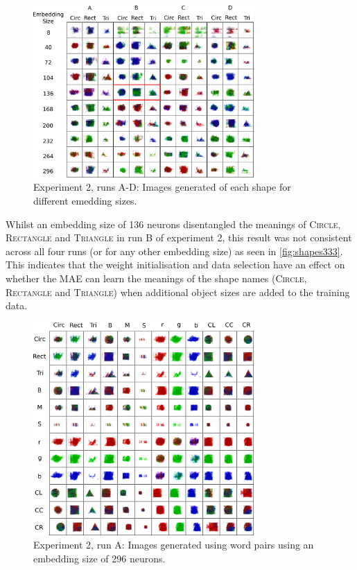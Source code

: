\begin{figure}[h]
\centering
\includegraphics[width=0.75\textwidth]{Figs/shapes/shapes333.png}
\caption{Experiment 2, runs A-D:  Images generated of each shape for different emedding sizes.}
\label{fig:shapes333}
\end{figure}

Whilst an embedding size of 136 neurons disentangled the meanings of \textsc{Circle}, \textsc{Rectangle} and \textsc{Triangle} in run B of experiment 2, this result was not consistent across all four runs (or for any other embedding size) as seen in \autoref{fig:shapes333}. This indicates that the weight initialisation and data selection have an effect on whether the MAE can learn the meanings of the shape names (\textsc{Circle}, \textsc{Rectangle} and \textsc{Triangle}) when additional object sizes are added to the training data.


\begin{figure}[h]
\centering
\includegraphics[width=0.75\textwidth]{Figs/shapes/2word333A.png}
\caption{Experiment 2, run A:  Images generated using word pairs using an embedding size of 296 neurons.}
\label{fig:2word333}
\end{figure}


